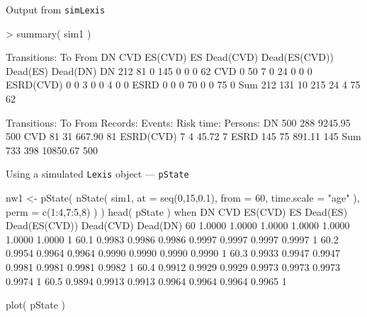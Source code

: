 \begin{frame}[fragile]{Output from \texttt{simLexis}}
\renewcommand{\baselinestretch}{0.8}
\footnotesize
\begin{semiverbatim}
> summary( sim1 )

Transitions:
     To
From         DN CVD ES(CVD)   ES Dead(CVD) Dead(ES(CVD)) Dead(ES) Dead(DN)
  DN        212  81       0  145         0             0        0       62
  CVD         0  50       7    0        24             0        0        0
  ESRD(CVD)   0   0       3    0         0             4        0        0
  ESRD        0   0       0   70         0             0       75        0
  Sum       212 131      10  215        24             4       75       62

Transitions:
     To
From         Records:  Events: Risk time:  Persons:
  DN              500      288    9245.95       500
  CVD              81       31     667.90        81
  ESRD(CVD)         7        4      45.72         7
  ESRD            145       75     891.11       145
  Sum             733      398   10850.67       500
\end{semiverbatim}
\normalsize
\renewcommand{\baselinestretch}{1.0}
\end{frame}

\begin{frame}[fragile]{Using a simulated \texttt{Lexis} object --- \texttt{pState}}
\renewcommand{\baselinestretch}{0.8}
\footnotesize
\begin{semiverbatim}
nw1 <- pState( nState( sim1,
                       at = seq(0,15,0.1),
                       from = 60,
                       time.scale = "age" ),
               perm = c(1:4,7:5,8) ) )
head( pState )
when       DN    CVD ES(CVD)     ES Dead(ES) Dead(ES(CVD)) Dead(CVD) Dead(DN)
  60   1.0000 1.0000  1.0000 1.0000   1.0000        1.0000    1.0000        1
  60.1 0.9983 0.9986  0.9986 0.9997   0.9997        0.9997    0.9997        1
  60.2 0.9954 0.9964  0.9964 0.9990   0.9990        0.9990    0.9990        1
  60.3 0.9933 0.9947  0.9947 0.9981   0.9981        0.9981    0.9982        1
  60.4 0.9912 0.9929  0.9929 0.9973   0.9973        0.9973    0.9974        1
  60.5 0.9894 0.9913  0.9913 0.9964   0.9964        0.9964    0.9965        1

plot( pState )
\end{semiverbatim}
\normalsize
\renewcommand{\baselinestretch}{1.0}
\end{frame}

